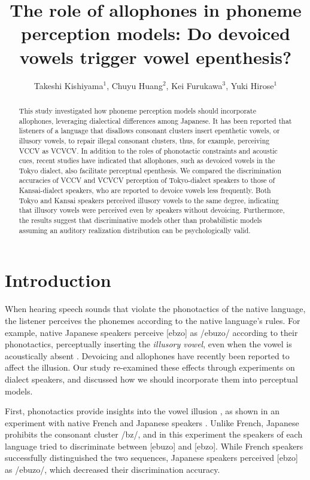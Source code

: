 \documentclass[a4paper,11pt,twocolumn]{article}
\title{The role of allophones in phoneme perception models: Do devoiced vowels trigger vowel epenthesis?}
\author{
    Takeshi Kishiyama$^1$,
    Chuyu Huang$^2$,
    Kei Furukawa$^3$,
    Yuki Hirose$^1$}
\begin{document}
\maketitle

\begin{abstract}
This study investigated how phoneme perception models should incorporate allophones, leveraging dialectical differences among Japanese. It has been reported that listeners of a language that disallows consonant clusters insert epenthetic vowels, or illusory vowels, to repair illegal consonant clusters, thus, for example, perceiving VCCV as VCVCV. In addition to the roles of phonotactic constraints and acoustic cues, recent studies have indicated that allophones, such as devoiced vowels in the Tokyo dialect, also facilitate perceptual epenthesis. We compared the discrimination accuracies of VCCV and VCVCV perception of Tokyo-dialect speakers to those of Kansai-dialect speakers, who are reported to devoice vowels less frequently. Both Tokyo and Kansai speakers perceived illusory vowels to the same degree, indicating that illusory vowels were perceived even by speakers without devoicing. Furthermore, the results suggest that discriminative models other than probabilistic models assuming an auditory realization distribution can be psychologically valid.
\end{abstract}


\section{Introduction}

When hearing speech sounds that violate the phonotactics of the native language, the listener perceives the phonemes according to the native language's rules. For example, native Japanese speakers perceive [ebzo] as /ebuzo/ according to their phonotactics, perceptually inserting the \textit{illusory vowel}, even when the vowel is acoustically absent \cite{dupoux1999epentheticvi, dupoux2011illusory}. Devoicing and allophones have recently been reported to affect the illusion. Our study re-examined these effects through experiments on dialect speakers, and discussed how we should incorporate them into perceptual models.

First, phonotactics provide insights into the vowel illusion \cite{dupoux1999epentheticvi, halle2014special, monahan2009not, mattingley2015influence, guevara2017predicting, guevara2017epenthetic}, as shown in an experiment with native French and Japanese speakers \cite{dupoux1999epentheticvi}. Unlike French, Japanese prohibits the consonant cluster /bz/, and in this experiment the speakers of each language tried to discriminate between [ebuzo] and [ebzo]. While French speakers successfully distinguished the two sequences, Japanese speakers perceived [ebzo] as /ebuzo/, which decreased their discrimination accuracy.
\end{document}
